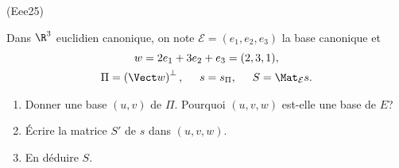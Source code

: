 \begin{tiny}(Eee25)\end{tiny} Dans $\R^3$ euclidien canonique, on note $\mathcal{E}=(e_1,e_2,e_3)$ la base canonique et 
\begin{multline*}
 w = 2e_1 + 3e_2 +e_3 = (2,3,1),\\
 \Pi = \left( \Vect w\right)^{\bot}, \hspace{0.5cm}
 s = s_{\Pi}, \hspace{0.5cm} S =\Mat_{\mathcal{E}}{s}. 
\end{multline*}
\begin{enumerate}
 \item Donner une base $(u,v)$ de $\Pi$. Pourquoi $(u,v,w)$ est-elle une base de $E$?
 \item \'Ecrire la matrice $S'$ de $s$ dans $(u,v,w)$.
 \item En déduire $S$.
\end{enumerate}
